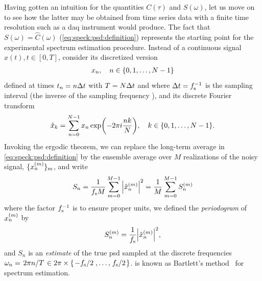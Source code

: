 Having gotten an intuition for the quantities $C(\tau)$ and $S(\omega)$, let us move on to see how the latter may be obtained from time series data with a finite time resolution such as a \acrlong{daq} instrument would produce.
The fact that $S(\omega) = \hat{C}(\omega)$ (\cref{eq:speck:psd:definition}) represents the starting point for the experimental spectrum estimation procedure.
Instead of a continuous signal $x(t), t\in [0, T]$, consider its discretized version
\begin{align}\label{eq:speck:signal:discrete}
    x_n \qc n\in\lbrace 0, 1, \dotsc, N - 1\rbrace
\end{align}
defined at times $t_n = n\Delta t$ with $T = N\Delta t$ and where $\Delta t = f_{\mathrm{s}}^{-1}$ is the sampling interval (the inverse of the sampling frequency \fs), and its discrete Fourier transform
\begin{equation}
    \hat{x}_k = \sum_{n=0}^{N-1} x_n\exp(-2\pi\i\frac{nk}{N})\qc k\in\lbrace 0, 1, \dotsc, N-1\rbrace.
\end{equation}
Invoking the ergodic theorem,
we can replace the long-term average in \cref{eq:speck:psd:definition} by the ensemble average over $M$ realizations of the noisy signal, $\lbrace x_n^{(m)}\rbrace_m$, and write
\begin{align}\label{eq:speck:psd:bartlett}
    S_n = \frac{1}{f_{\mathrm{s}} M} \sum_{m=0}^{M-1} \abs{\hat{x}_n^{(m)}}^2 = \frac{1}{M} \sum_{m=0}^{M-1} S_n^{(m)}
\end{align}
where the factor $f_{\mathrm{s}}^{-1}$ is to ensure proper units, we defined the \emph{periodogram} of $x_n^{(m)}$ by
\begin{align}\label{eq:speck:periodogram}
    S_n^{(m)} = \frac{1}{f_{\mathrm{s}}}\abs{\hat{x}_n^{(m)}}^2,
\end{align}
and $S_n$ is an \emph{estimate} of the true \gls{psd} sampled at the discrete frequencies $\omega_n = \flatfrac{2\pi n}{T} \in 2\pi\times\lbrace\flatfrac{-\fs}{2}, \dotsc, \flatfrac{\fs}{2}\rbrace$.
 is known as Bartlett's method~\cite{Bartlett1948} for spectrum estimation.

